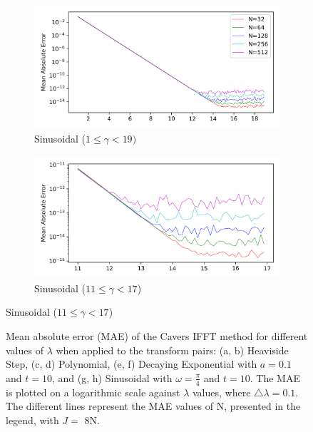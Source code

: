 \documentclass[a4paper]{report}
\begin{document}
\begin{figure}[H]
    \begin{subfigure}{.45\linewidth}
      \includegraphics[width=\linewidth]{images/cavers/sinusoidal.png}
      \caption{Sinusoidal ($1 \leq \gamma < 19)$}
    \end{subfigure}\hfill
    \begin{subfigure}{.45\linewidth}
      \includegraphics[width=\linewidth]{images/cavers/sinusoidal_zoomed.png}
      \caption{Sinusoidal ($11 \leq \gamma < 17$)}
    \end{subfigure}
\end{figure}

\begin{figure}[H]\ContinuedFloat
    
    \caption{Mean absolute error (MAE) of the Cavers IFFT method for different values of $\lambda$ when applied to the transform pairs: (a, b) Heaviside Step, (c, d) Polynomial, (e, f) Decaying Exponential with $a = 0.1$ and $t = 10$, and (g, h) Sinusoidal with $\omega = \frac{\pi}{4}$ and $t = 10$. The MAE is plotted on a logarithmic scale against $\lambda$ values, where $\triangle \lambda = 0.1$. The different lines represent the MAE values of N, presented in the legend, with $J =$ 8N.}
    \label{fig:MAE_Cavers_IFFT_8N}
\end{figure}
\end{document}
